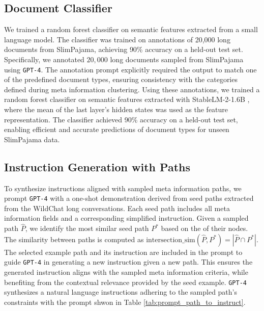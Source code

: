 \label{sec:appendix_exp_details}

\subsection{Document Classifier}
\label{sec:appendix_doc_classifier}
We trained a random forest classifier on semantic features extracted from a small language model. The classifier was trained on annotations of 20,000 long documents from SlimPajama, achieving 90\% accuracy on a held-out test set. 
Specifically, we annotated $20,000$ long documents sampled from SlimPajama using {\tt GPT-4}. The annotation prompt explicitly required the output to match one of the predefined document types, ensuring consistency with the categories defined during meta information clustering. Using these annotations, we trained a random forest classifier on semantic features extracted with StableLM-2-1.6B \citep{bellagente2024stablelm}, where the mean of the last layer's hidden states was used as the feature representation. The classifier achieved 90\% accuracy on a held-out test set, enabling efficient and accurate predictions of document types for unseen SlimPajama data.

\subsection{Instruction Generation with Paths}
\label{sec:appendix_demo}
To synthesize instructions aligned with sampled meta information paths, we prompt {\tt GPT-4} with a one-shot demonstration derived from seed paths extracted from the WildChat long conversations. 
Each seed path includes all meta information fields and a corresponding simplified instruction.
Given a sampled path $\hat{P}$, we identify the most similar seed path $P^*$ based on the of their nodes. The similarity between paths is computed as $\text{intersection\_sim}(\hat{P}, P^*) = | \hat{P} \cap P^* |.$ The selected example path and its instruction are included in the prompt to guide {\tt GPT-4} in generating a new instruction given a new path. This ensures the generated instruction aligns with the sampled meta information criteria, while benefiting from the contextual relevance provided by the seed example.
{\tt GPT-4} synthesizes a natural language instructions adhering to the sampled path's constraints with the prompt shwon in Table \ref{tab:prompt_path_to_instruct}.

